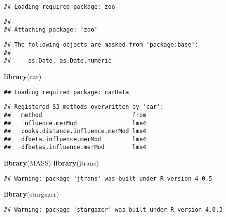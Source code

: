 \documentclass[
]{article}
\newenvironment{Shaded}{\begin{snugshade}}{\end{snugshade}}
\newcommand{\KeywordTok}[1]{\textcolor[rgb]{0.13,0.29,0.53}{\textbf{#1}}}
\newcommand{\NormalTok}[1]{#1}
\begin{document}
\begin{verbatim}
## Loading required package: zoo
\end{verbatim}

\begin{verbatim}
## 
## Attaching package: 'zoo'
\end{verbatim}

\begin{verbatim}
## The following objects are masked from 'package:base':
## 
##     as.Date, as.Date.numeric
\end{verbatim}

\begin{Shaded}
\begin{Highlighting}[]
\KeywordTok{library}\NormalTok{(car)}
\end{Highlighting}
\end{Shaded}

\begin{verbatim}
## Loading required package: carData
\end{verbatim}

\begin{verbatim}
## Registered S3 methods overwritten by 'car':
##   method                          from
##   influence.merMod                lme4
##   cooks.distance.influence.merMod lme4
##   dfbeta.influence.merMod         lme4
##   dfbetas.influence.merMod        lme4
\end{verbatim}

\begin{Shaded}
\begin{Highlighting}[]
\KeywordTok{library}\NormalTok{(MASS)}
\KeywordTok{library}\NormalTok{(jtrans)}
\end{Highlighting}
\end{Shaded}

\begin{verbatim}
## Warning: package 'jtrans' was built under R version 4.0.5
\end{verbatim}

\begin{Shaded}
\begin{Highlighting}[]
\KeywordTok{library}\NormalTok{(stargazer)}
\end{Highlighting}
\end{Shaded}

\begin{verbatim}
## Warning: package 'stargazer' was built under R version 4.0.3
\end{verbatim}
\end{document}
